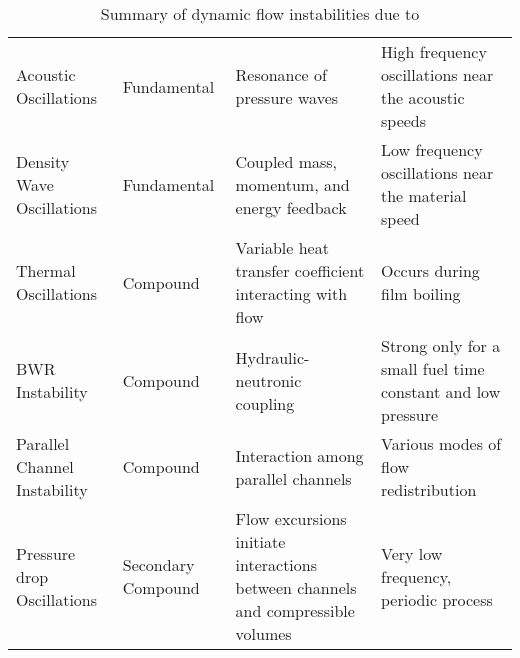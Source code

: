 \begin{table}
    \centering
    \caption[Summary of dynamic flow instabilities]{Summary of dynamic flow instabilities due to \cite{boure_review_1973-1}}
    \label{Table:DynamicInstabilities}
    \renewcommand{\arraystretch}{1.4}
    {\small
    \begin{tabular}{>{\centering}p{1.1in} >{\centering}p{1.1in} >{\raggedright}p{1.55in} >{\raggedright\arraybackslash}p{1.55in} }
        \toprule
        \multicolumn{1}{c}{\textbf{Name}}      & \multicolumn{1}{c}{\textbf{Class}} & 
        \multicolumn{1}{c}{\textbf{Mechanism}} & \multicolumn{1}{c}{\textbf{Characteristics}}\\\midrule
        Acoustic  Oscillations  & Fundamental & Resonance of pressure waves & 
                High frequency oscillations near the acoustic speeds\\
        Density Wave  Oscillations  & Fundamental & Coupled mass, momentum, and energy feedback & 
                Low frequency oscillations near the material speed\\
        Thermal  Oscillations  & Compound & Variable heat transfer coefficient interacting with flow & 
                Occurs during film boiling \\
        BWR  Instability &  Compound & Hydraulic-neutronic coupling & 
                Strong only for a small fuel time constant and low pressure\\
        Parallel  Channel  Instability & Compound & Interaction among parallel channels & 
                Various modes of flow redistribution\\
        Pressure drop  Oscillations & Secondary Compound& 
                Flow excursions initiate interactions between channels and compressible volumes & 
                        Very low frequency, periodic process\\
    \bottomrule
    \end{tabular}
    }
\end{table}
